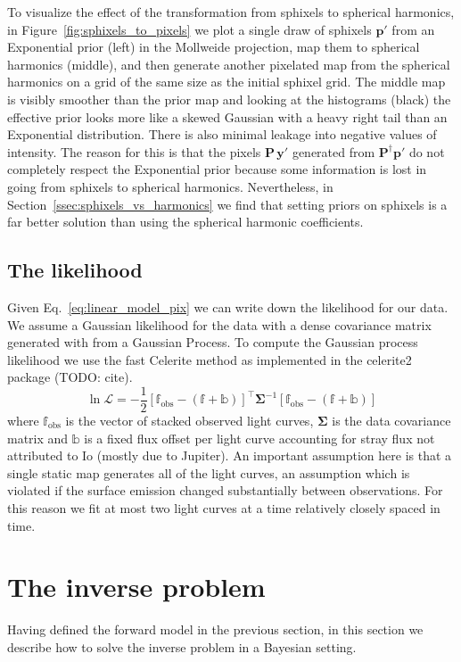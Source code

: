 \documentclass[modern]{aastex62}
\begin{document}
To visualize the effect of the transformation from sphixels to spherical harmonics, in Figure~\ref{fig:sphixels_to_pixels} we plot a single draw of sphixels $\mathbf{p}'$ from an Exponential prior (left) in the Mollweide projection, map them to spherical harmonics (middle), and then generate another pixelated map from the spherical harmonics on a grid of the same size as the initial sphixel grid.
The middle map is visibly smoother than the prior map and looking at the histograms (black) the effective prior looks more like a skewed Gaussian with a heavy right tail than an Exponential distribution.
There is also minimal leakage into negative values of intensity.
The reason for this is that the pixels $\mathbf{P}\,\mathbf{y}'$ generated from $\mathbf{P}^\dagger\mathbf{p}'$ do not completely respect the Exponential prior because some information is lost in going from sphixels to spherical harmonics.
Nevertheless, in Section~\ref{ssec:sphixels_vs_harmonics} we find that setting priors on sphixels is a far better solution than using the spherical harmonic coefficients.

\subsection{The likelihood}
\label{ssec:likelihood}
Given Eq.~\ref{eq:linear_model_pix} we can write down the likelihood for our data.
We assume a Gaussian likelihood for the data with a dense covariance matrix generated with from a Gaussian Process.
To compute the Gaussian process likelihood we use the fast Celerite method \citep{foreman-mackey2017} as implemented in the \textsf{celerite2} package (TODO: cite).
\begin{equation}
    \ln\mathcal{L}=-\frac{1}{2}\left[\mathbb{f}_\mathrm{obs}-(\mathbb{f} + \mathbb{b})\right]^{\top} \boldsymbol{\Sigma}^{-1}\left[\mathbb{f}_\mathrm{obs}-(\mathbb{f} + \mathbb{b})\right]
\end{equation}
where $\mathbb{f}_\mathrm{obs}$ is the vector of stacked observed light curves, $\boldsymbol{\Sigma}$ is the data covariance matrix and $\mathbb{b}$ is a fixed flux offset per light curve accounting for stray flux not attributed to Io (mostly due to Jupiter).
An important assumption here is that a single static map generates all of the light curves, an assumption which is violated if the surface emission changed substantially between observations. 
For this reason we fit at most two light curves at a time relatively closely spaced in time.

\section{The inverse problem}
\label{sec:inverse_problem}
Having defined the forward model in the previous section, in this section we describe how to solve the inverse problem in a Bayesian setting.
\end{document}
